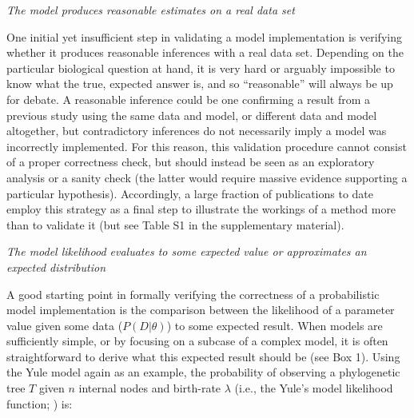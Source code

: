 \documentclass[oneside]{article}
\begin{document}


\vspace{.25cm}
\noindent \emph{The model produces reasonable estimates on a real
  data set}

One initial yet insufficient step in validating a model implementation
is verifying whether it produces reasonable inferences with a real
data set.
Depending on the particular biological question at hand, it is very
hard or arguably impossible to know what the true, expected answer is,
and so ``reasonable'' will always be up for debate.
A reasonable inference could be one confirming a result from a previous study
using the same data and model, or different data and model
altogether, but contradictory inferences do not necessarily imply a model
was incorrectly implemented.
For this reason, this validation procedure cannot consist of a proper
correctness check, but should instead be seen as an exploratory
analysis or a sanity check (the latter would require massive
evidence supporting a particular hypothesis).
Accordingly, a large fraction of publications to date employ this
strategy as a final step to illustrate the workings of a method more
than to validate it (but see Table S1 in the supplementary material).

\vspace{.5cm}
\noindent \emph{The model likelihood evaluates to some
  expected value or approximates an expected distribution}

A good starting point in formally verifying the correctness of a
probabilistic model implementation is the comparison between the
likelihood of a parameter value given some data ($P(D|\theta)$) to
some expected result.
When models are sufficiently simple, or by focusing
on a subcase of a complex model, it is often straightforward to derive
what this expected result should be (see Box 1).
Using the Yule model again as an example, the probability of observing
a phylogenetic tree $T$ given $n$ internal nodes and birth-rate
$\lambda$ (i.e., the Yule's model likelihood function;
\citealp{nee01}) is:
\end{document}

